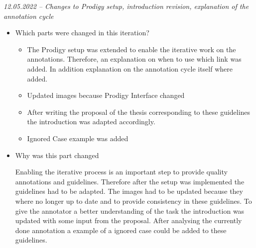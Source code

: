 \documentclass{article}
\begin{document}
\begin{mdframed}
\emph{12.05.2022 – Changes to Prodigy setup, introduction revision, explanation of the annotation cycle }
\begin{itemize}
	\item Which parts were changed in this iteration? 
	\begin{itemize}
	    \item The Prodigy setup was extended to enable the iterative work on the annotations. Therefore, an explanation on when to use which link was added. In addition explanation on the annotation cycle itself where added.
	    \item Updated images because Prodigy Interface changed
	    \item After writing the proposal of the thesis corresponding to these guidelines the introduction was adapted accordingly.
	    \item Ignored Case example was added
	\end{itemize} 
    \item Why was this part changed
    
    Enabling the iterative process is an important step to provide quality annotations and guidelines. Therefore after the setup was implemented the guidelines had to be adapted. The images had to be updated because they where no longer up to date and to provide consistency in these guidelines. To give the annotator a better understanding of the task the introduction was updated with some input from the proposal. After analysing the currently done annotation a example of a ignored case could be added to these guidelines.
    
\end{itemize}
\end{mdframed}
\end{document}
